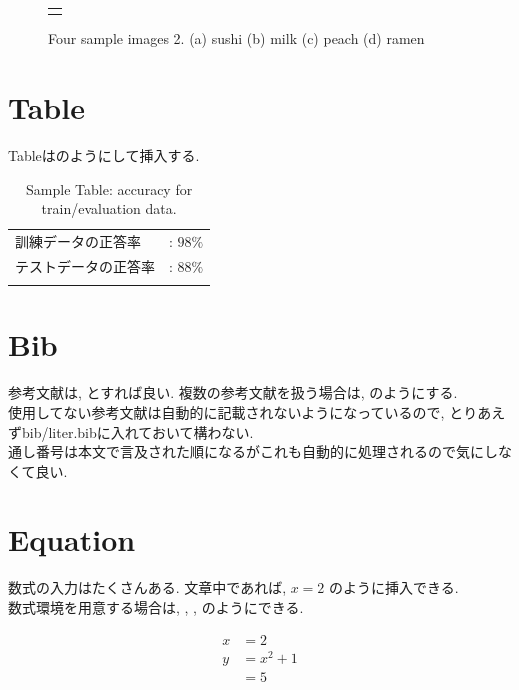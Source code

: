 \documentclass[/Users/ikedahajime/GitHub/reserch/master_report/thesis]{subfiles}
\begin{document}
\begin{figure}[H]
\begin{tabular}{c}
\begin{minipage}{0.25\hsize}
				\text{(d)}
			\end{minipage}
		\end{tabular}
		\caption[Four sample images]
		{
			Four sample images 2.
			(a) sushi (b) milk (c) peach (d) ramen
		}
		\label{fig:sample_four_images2}
	\end{figure}

\section{Table}
Tableはのようにして挿入する.
\begin{table}[H]
	\centering
	\caption{Sample Table: accuracy for train/evaluation data.}
	\begin{tabular}{ll}\hline
		 訓練データの正答率&: $98\%$ \\
		 テストデータの正答率&: $88\%$ \\
	\label{tb:sample_table}
	\end{tabular}
\end{table}

\section{Bib}
参考文献は, \cite{author:06}とすれば良い.
複数の参考文献を扱う場合は, \cite{author:06, conference:06}のようにする.\\
使用してない参考文献は自動的に記載されないようになっているので, とりあえずbib/liter.bibに入れておいて構わない.\\
通し番号は本文で言及された順になるがこれも自動的に処理されるので気にしなくて良い.

\section{Equation}
数式の入力はたくさんある.
文章中であれば, $x = 2$ のように挿入できる.\\
数式環境を用意する場合は, , , のようにできる.

\begin{align}
    x &= 2 \label{eq:sample1}\\
    y &= x^2 + 1 \label{eq:sample2}\\
      &= 5 \label{eq:sample3}
\end{align}
\ifSubfilesClassLoaded{
	
}{}
\end{document}
